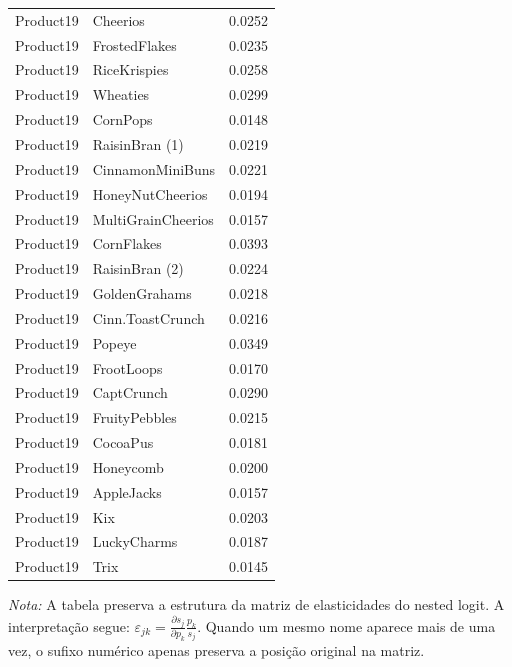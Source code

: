 \begin{table}[H]
\begin{tabular}{llr}
Product19 & Cheerios & 0.0252 \\
Product19 & FrostedFlakes & 0.0235 \\
Product19 & RiceKrispies & 0.0258 \\
Product19 & Wheaties & 0.0299 \\
Product19 & CornPops & 0.0148 \\
Product19 & RaisinBran (1) & 0.0219 \\
Product19 & CinnamonMiniBuns & 0.0221 \\
Product19 & HoneyNutCheerios & 0.0194 \\
Product19 & MultiGrainCheerios & 0.0157 \\
Product19 & CornFlakes & 0.0393 \\
Product19 & RaisinBran (2) & 0.0224 \\
Product19 & GoldenGrahams & 0.0218 \\
Product19 & Cinn.ToastCrunch & 0.0216 \\
Product19 & Popeye & 0.0349 \\
Product19 & FrootLoops & 0.0170 \\
Product19 & CaptCrunch & 0.0290 \\
Product19 & FruityPebbles & 0.0215 \\
Product19 & CocoaPus & 0.0181 \\
Product19 & Honeycomb & 0.0200 \\
Product19 & AppleJacks & 0.0157 \\
Product19 & Kix & 0.0203 \\
Product19 & LuckyCharms & 0.0187 \\
Product19 & Trix & 0.0145 \\
\bottomrule
\end{tabular}

\vspace{0.3em}
\footnotesize
\textit{Nota:} A tabela preserva a estrutura da matriz de elasticidades do nested logit. A interpretação segue: $\varepsilon_{jk}=\frac{\partial s_j}{\partial p_k}\frac{p_k}{s_j}$. Quando um mesmo nome aparece mais de uma vez, o sufixo numérico apenas preserva a posição original na matriz.
\end{table}
\endgroup


